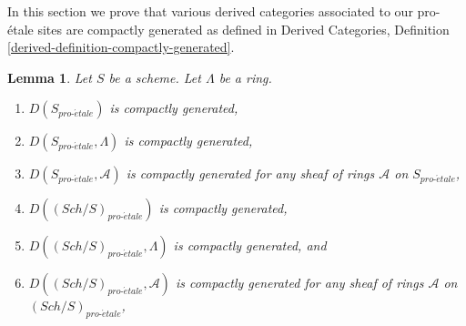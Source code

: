 \documentclass{stacks-project}
\theoremstyle{plain}
\newtheorem{lemma}[subsection]{Lemma}
\theoremstyle{definition}
\theoremstyle{remark}
\numberwithin{equation}{subsection}
\def\Sch{\mathit{Sch}}
\def\proetale{{pro\text{-}\acute{e}tale}}
\begin{document}
\noindent
In this section we prove that various derived categories associated
to our pro-\'etale sites are compactly generated as defined in
Derived Categories, Definition \ref{derived-definition-compactly-generated}.

\begin{lemma}
\label{lemma-enough-compact-proetale}
Let $S$ be a scheme. Let $\Lambda$ be a ring.
\begin{enumerate}
\item $D(S_\proetale)$ is compactly generated,
\item $D(S_\proetale, \Lambda)$ is compactly generated,
\item $D(S_\proetale, \mathcal{A})$ is compactly generated
for any sheaf of rings $\mathcal{A}$ on $S_\proetale$,
\item $D((\Sch/S)_\proetale)$ is compactly generated,
\item $D((\Sch/S)_\proetale, \Lambda)$ is compactly generated, and
\item $D((\Sch/S)_\proetale, \mathcal{A})$ is compactly generated
for any sheaf of rings $\mathcal{A}$ on $(\Sch/S)_\proetale$,
\end{enumerate}
\end{lemma}
\end{document}
